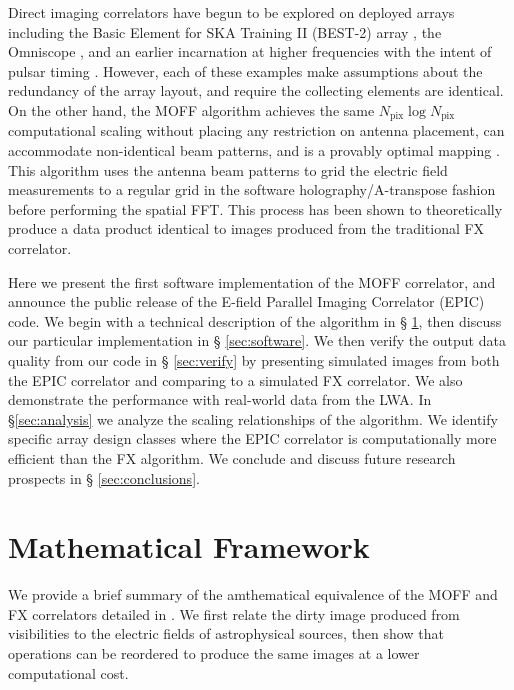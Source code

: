 \documentclass[a4paper,fleqn,usenatbib]{../mnras}
\newcommand{\Npix}{N_{\text{pix}}}
\begin{document}
Direct imaging correlators have begun to be explored on deployed arrays including
the Basic Element for SKA Training II (BEST-2) array \citep{fos14}, the Omniscope
\citep{zhe14}, and an earlier incarnation at higher frequencies with the intent
of pulsar timing \citep{oto94, dai00}. However, each of these examples make
assumptions about the redundancy of the array layout, and require the collecting
elements are identical. On the other hand, the MOFF algorithm achieves the same
$\Npix \log \Npix$ computational scaling without placing any restriction on
antenna placement, can accommodate non-identical beam patterns, and is 
a provably optimal mapping \citep{mor11}. This algorithm uses the antenna beam 
patterns to grid the electric field measurements to a regular grid in the software
holography/A-transpose fashion \citep{mor09,bha08,teg97b} before performing the
spatial FFT. This process has been shown to theoretically produce a data product
identical to images produced from the traditional FX correlator.

Here we present the first software implementation of the MOFF correlator, and
announce the public release of the E-field Parallel Imaging Correlator (EPIC)
code. We begin with a technical description of the algorithm in \S
\ref{sec:math}, then discuss our particular implementation in \S
\ref{sec:software}. We then verify the output data quality from our code in \S
\ref{sec:verify} by presenting simulated images from both the EPIC correlator
and comparing to a simulated FX correlator. We also demonstrate the performance
with real-world data from the LWA. In \S \ref{sec:analysis} we analyze the
scaling relationships of the algorithm. We identify specific array design classes
where the EPIC correlator is computationally more efficient than the FX
algorithm. We conclude and discuss future research prospects in \S
\ref{sec:conclusions}.


\section{Mathematical Framework}\label{sec:math}

We provide a brief summary of the amthematical equivalence of the MOFF and 
FX correlators detailed in \citet{mor11}. We first relate the dirty image produced 
from visibilities to the electric fields of astrophysical sources, then show that 
operations can be reordered to produce the same images at a lower 
computational cost.
\end{document}
